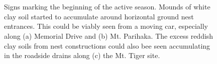 \begin{figure}[!htbp]\myfloatalign
{} \ \
 \\
 \ \
\caption[Signs marking the beginning of the active season.]{Signs marking the beginning of the active season. Mounds of white clay soil started to accumulate around horizontal ground nest entrances. This could be viably seen from a moving car, especially along (a) Memorial Drive and (b) Mt. Parihaka. The excess reddish clay soils from nest constructions could also bee seen accumulating in the roadside drains along (c) the Mt. Tiger site. }\label{fig:signs-image}
\end{figure}


